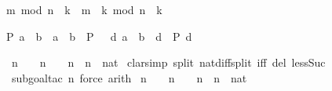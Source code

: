 \begin{isabellebody}
\begin{isamarkuptext}
\begin{isabelle}%
m\ mod\ n\ {\isacharasterisk}\ k\ {\isacharequal}\ m\ {\isacharasterisk}\ k\ mod\ {\isacharparenleft}n\ {\isacharasterisk}\ k{\isacharparenright}%
\end{isabelle}

\begin{isabelle}%
P\ {\isacharparenleft}a\ {\isacharminus}\ b{\isacharparenright}\ {\isacharequal}\ {\isacharparenleft}{\isacharparenleft}a\ {\isacharless}\ b\ {\isasymlongrightarrow}\ P\ {}{\isacharparenright}\ {\isasymand}\ {\isacharparenleft}{\isasymforall}d{\isachardot}\ a\ {\isacharequal}\ b\ {\isacharplus}\ d\ {\isasymlongrightarrow}\ P\ d{\isacharparenright}{\isacharparenright}%
\end{isabelle}
%
\end{isamarkuptext}%
\isamarkuptrue%
\isamarkupfalse%
\ {\isachardoublequoteopen}{\isacharparenleft}n\ {\isacharminus}\ {}{\isacharparenright}\ {\isacharasterisk}\ {\isacharparenleft}n\ {\isacharplus}\ {}{\isacharparenright}\ {\isacharequal}\ n\ {\isacharasterisk}\ n\ {\isacharminus}\ {\isacharparenleft}{}{\isacharcolon}{\isacharcolon}nat{\isacharparenright}{\isachardoublequoteclose}\isanewline
%
\isadelimproof
%
\endisadelimproof
%
\isatagproof
{}\isamarkupfalse%
\ {\isacharparenleft}clarsimp\ split{\isacharcolon}\ nat{\isacharunderscore}diff{\isacharunderscore}split\ iff\ del{\isacharcolon}\ less{\isacharunderscore}Suc{}{\isacharparenright}\isanewline
\ %
\isanewline
{}\isamarkupfalse%
\ {\isacharparenleft}subgoal{\isacharunderscore}tac\ {\isachardoublequoteopen}n{\isacharequal}{}{\isachardoublequoteclose}{\isacharcomma}\ force{\isacharcomma}\ arith{\isacharparenright}\isanewline
{}\isamarkupfalse%
%
\endisatagproof
{\isafoldproof}%
%
\isadelimproof
\isanewline
%
\endisadelimproof
\isanewline
\isanewline
{}\isamarkupfalse%
\ {\isachardoublequoteopen}{\isacharparenleft}n\ {\isacharminus}\ {}{\isacharparenright}\ {\isacharasterisk}\ {\isacharparenleft}n\ {\isacharplus}\ {}{\isacharparenright}\ {\isacharequal}\ n\ {\isacharasterisk}\ n\ {\isacharminus}\ {\isacharparenleft}{}{\isacharcolon}{\isacharcolon}nat{\isacharparenright}{\isachardoublequoteclose}\isanewline

\end{isabellebody}
